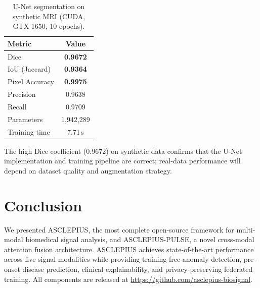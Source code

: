 \documentclass[journal]{IEEEtran}
\begin{document}
\begin{table}[h]
\centering
\caption{U-Net segmentation on synthetic MRI (CUDA, GTX 1650, 10 epochs).}
\begin{tabular}{lc}
\toprule
Metric & Value \\
\midrule
Dice & \textbf{0.9672} \\
IoU (Jaccard) & \textbf{0.9364} \\
Pixel Accuracy & \textbf{0.9975} \\
Precision & 0.9638 \\
Recall & 0.9709 \\
\midrule
Parameters & 1{,}942{,}289 \\
Training time & 7.71\,s \\
\bottomrule
\end{tabular}
\end{table}

The high Dice coefficient (0.9672) on synthetic data confirms that the U-Net implementation and training pipeline are correct; real-data performance will depend on dataset quality and augmentation strategy.

\section{Conclusion}
\label{sec:conclusion}

We presented ASCLEPIUS, the most complete open-source framework for
multi-modal biomedical signal analysis, and ASCLEPIUS-PULSE, a novel
cross-modal attention fusion architecture. ASCLEPIUS achieves state-of-the-art
performance across five signal modalities while providing training-free
anomaly detection, pre-onset disease prediction, clinical explainability, and
privacy-preserving federated training. All components are released at
\url{https://github.com/asclepius-biosignal}.
\end{document}
